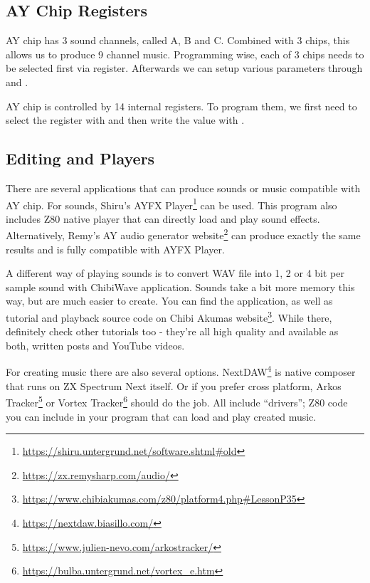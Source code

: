 \documentclass[12pt,twoside,openright,a4paper]{book}
\begin{document}
\subsection{AY Chip Registers}

AY chip has 3 sound channels, called A, B and C. Combined with 3 chips, this allows us to produce 9 channel music. Programming wise, each of 3 chips needs to be selected first via  register. Afterwards we can setup various parameters through  and .

AY chip is controlled by 14 internal registers. To program them, we first need to select the register with  and then write the value with .


\subsection{Editing and Players}

There are several applications that can produce sounds or music compatible with AY chip. For sounds, Shiru's AYFX Player\footnote{\url{https://shiru.untergrund.net/software.shtml#old}} can be used. This program also includes Z80 native player that can directly load and play sound effects. Alternatively, Remy's AY audio generator website\footnote{\url{https://zx.remysharp.com/audio/}} can produce exactly the same results and is fully compatible with AYFX Player.

A different way of playing sounds is to convert WAV file into 1, 2 or 4 bit per sample sound with ChibiWave application. Sounds take a bit more memory this way, but are much easier to create. You can find the application, as well as tutorial and playback source code on Chibi Akumas website\footnote{\url{https://www.chibiakumas.com/z80/platform4.php#LessonP35}}. While there, definitely check other tutorials too - they're all high quality and available as both, written posts and YouTube videos.

For creating music there are also several options. NextDAW\footnote{\url{https://nextdaw.biasillo.com/}} is native composer that runs on ZX Spectrum Next itself. Or if you prefer cross platform, Arkos Tracker\footnote{\url{https://www.julien-nevo.com/arkostracker/}} or Vortex Tracker\footnote{\url{https://bulba.untergrund.net/vortex_e.htm}} should do the job. All include ``drivers''; Z80 code you can include in your program that can load and play created music.
\end{document}
